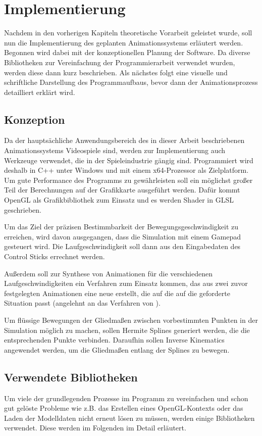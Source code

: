 \chapter{Implementierung} \label{implementierung}
Nachdem in den vorherigen Kapiteln theoretische Vorarbeit geleistet wurde, soll nun die Implementierung des geplanten Animationssystems erläutert werden. Begonnen wird dabei mit der konzeptionellen Planung der Software. Da diverse Bibliotheken zur Vereinfachung der Programmierarbeit verwendet wurden, werden diese dann kurz beschrieben. Als nächstes folgt eine visuelle und schriftliche Darstellung des Programmaufbaus, bevor dann der Animationsprozess detailliert erklärt wird.


\section{Konzeption}
Da der hauptsächliche Anwendungsbereich des in dieser Arbeit beschriebenen Animationssystems Videospiele sind, werden zur Implementierung auch Werkzeuge verwendet, die in der Spieleindustrie gängig sind. Programmiert wird deshalb in C++ unter Windows und mit einem x64-Prozessor als Zielplatform. Um gute Performance des Programms zu gewährleisten soll ein möglichst großer Teil der Berechnungen auf der Grafikkarte ausgeführt werden. Dafür kommt OpenGL als Grafikbibliothek zum Einsatz und es werden Shader in GLSL geschrieben.

Um das Ziel der präzisen Bestimmbarkeit der Bewegungsgeschwindigkeit zu erreichen, wird davon ausgegangen, dass die Simulation mit einem Gamepad gesteuert wird. Die Laufgeschwindigkeit soll dann aus den Eingabedaten des Control Sticks errechnet werden.

Außerdem soll zur Synthese von Animationen für die verschiedenen Laufgeschwindigkeiten ein Verfahren zum Einsatz kommen, das aus zwei zuvor festgelegten Animationen eine neue erstellt, die auf die auf die geforderte Situation passt (angelehnt an das Verfahren von \cite{johansen2009automated}).

Um flüssige Bewegungen der Gliedmaßen zwischen vorbestimmten Punkten in der Simulation möglich zu machen, sollen Hermite Splines generiert werden, die die entsprechenden Punkte verbinden. Daraufhin sollen Inverse Kinematics angewendet werden, um die Gliedmaßen entlang der Splines zu bewegen.

\section{Verwendete Bibliotheken}
Um viele der grundlegenden Prozesse im Programm zu vereinfachen und schon gut gelöste Probleme wie z.B. das Erstellen eines OpenGL-Kontexts oder das Laden der Modelldaten nicht erneut lösen zu müssen, werden einige Bibliotheken verwendet. Diese werden im Folgenden im Detail erläutert.

